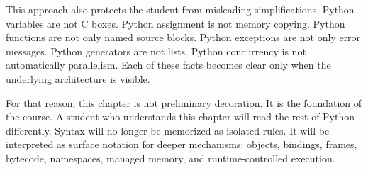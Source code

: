 This approach also protects the student from misleading simplifications. Python variables are not C boxes. Python assignment is not memory copying. Python functions are not only named source blocks. Python exceptions are not only error messages. Python generators are not lists. Python concurrency is not automatically parallelism. Each of these facts becomes clear only when the underlying architecture is visible.

For that reason, this chapter is not preliminary decoration. It is the foundation of the course. A student who understands this chapter will read the rest of Python differently. Syntax will no longer be memorized as isolated rules. It will be interpreted as surface notation for deeper mechanisms: objects, bindings, frames, bytecode, namespaces, managed memory, and runtime-controlled execution.